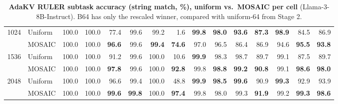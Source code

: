 \begin{table}[tp]
\begin{tabular}{@{} c l rrrrrrrrrrrrr @{}}
    \cmidrule(l){1-15}
    \multirow{2}{*}{1024} & Uniform & 100.0 & 100.0 & 77.4 & 99.6 & 99.2 & 1.6 & \textbf{99.8} & \textbf{98.0} & \textbf{93.6} & \textbf{87.3} & \textbf{98.9} & 84.5 & 86.9 \\
     & MOSAIC & 100.0 & 100.0 & \textbf{96.6} & 99.6 & \textbf{99.4} & \textbf{74.6} & 97.0 & 96.5 & 86.4 & 86.9 & 94.6 & \textbf{95.5} & \textbf{93.8} \\
    \cmidrule(l){1-15}
    \multirow{2}{*}{1536} & Uniform & 100.0 & 100.0 & 91.2 & 99.6 & 100.0 & 10.6 & \textbf{99.9} & 98.3 & 98.7 & 89.7 & 99.1 & 87.5 & 89.7 \\
     & MOSAIC & 100.0 & 100.0 & \textbf{97.8} & 99.6 & 100.0 & \textbf{92.8} & 99.8 & \textbf{98.8} & \textbf{99.2} & \textbf{90.8} & 99.1 & \textbf{98.6} & \textbf{98.0} \\
    \cmidrule(l){1-15}
    \multirow{2}{*}{2048} & Uniform & 100.0 & 100.0 & 96.6 & 99.4 & 100.0 & 48.8 & \textbf{99.9} & \textbf{98.5} & \textbf{99.6} & 90.9 & \textbf{99.3} & 92.9 & 93.9 \\
     & MOSAIC & 100.0 & 100.0 & \textbf{99.6} & \textbf{99.8} & 100.0 & \textbf{97.4} & 99.8 & 98.0 & 99.3 & \textbf{91.9} & 99.2 & \textbf{99.3} & \textbf{98.6} \\
    \bottomrule
  \end{tabular}
  \caption{\textbf{AdaKV RULER subtask accuracy (string match, \%), uniform vs.\ MOSAIC per cell} (Llama-3-8B-Instruct). B64 has only the rescaled winner, compared with uniform-64 from Stage 2.}
  \label{tab:app-ruler-adakv}
\end{table}

